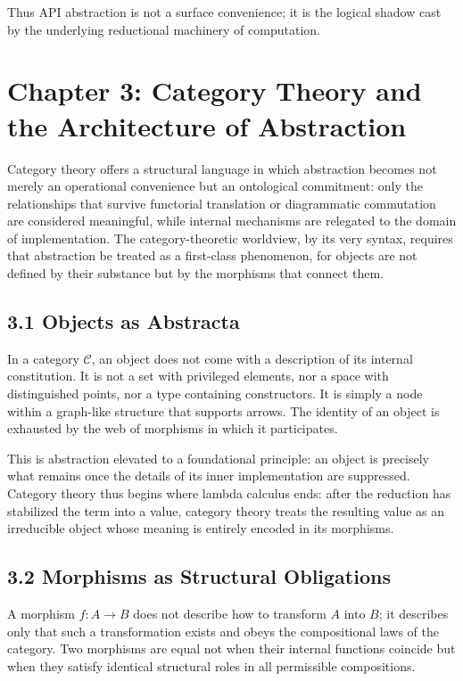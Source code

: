 \documentclass[12pt,letterpaper]{article}
\theoremstyle{remark}
\begin{document}
Thus API abstraction is not a surface convenience; it is the logical shadow cast by the underlying reductional machinery of computation.

\newpage

\section{Chapter 3: Category Theory and the Architecture of Abstraction}

Category theory offers a structural language in which abstraction becomes not merely an operational convenience but an ontological commitment: only the relationships that survive functorial translation or diagrammatic commutation are considered meaningful, while internal mechanisms are relegated to the domain of implementation. The category-theoretic worldview, by its very syntax, requires that abstraction be treated as a first-class phenomenon, for objects are not defined by their substance but by the morphisms that connect them.

\subsection{3.1 Objects as Abstracta}

In a category \(\mathcal{C}\), an object does not come with a description of its internal constitution. It is not a set with privileged elements, nor a space with distinguished points, nor a type containing constructors. It is simply a node within a graph-like structure that supports arrows. The identity of an object is exhausted by the web of morphisms in which it participates.

This is abstraction elevated to a foundational principle: an object is precisely what remains once the details of its inner implementation are suppressed. Category theory thus begins where lambda calculus ends: after the reduction has stabilized the term into a value, category theory treats the resulting value as an irreducible object whose meaning is entirely encoded in its morphisms.

\subsection{3.2 Morphisms as Structural Obligations}

A morphism \(f : A \to B\) does not describe how to transform \(A\) into \(B\); it describes only that such a transformation exists and obeys the compositional laws of the category. Two morphisms are equal not when their internal functions coincide but when they satisfy identical structural roles in all permissible compositions.
\end{document}
